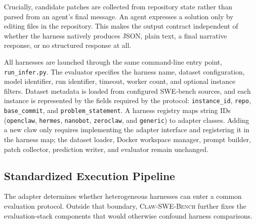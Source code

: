 Crucially, candidate patches are collected from repository state rather than parsed from an agent's final message. An agent expresses a solution only by editing files in the repository. This makes the output contract independent of whether the harness natively produces JSON, plain text, a final narrative response, or no structured response at all.

All harnesses are launched through the same command-line entry point, \texttt{run\_infer.py}. The evaluator specifies the harness name, dataset configuration, model identifier, run identifier, timeout, worker count, and optional instance filters. Dataset metadata is loaded from configured SWE-bench sources, and each instance is represented by the fields required by the protocol: \texttt{instance\_id}, \texttt{repo}, \texttt{base\_commit}, and \texttt{problem\_statement}. A harness registry maps string IDs (\texttt{openclaw}, \texttt{hermes}, \texttt{nanobot}, \texttt{zeroclaw}, and \texttt{generic}) to adapter classes. Adding a new claw only requires implementing the adapter interface and registering it in the harness map; the dataset loader, Docker workspace manager, prompt builder, patch collector, prediction writer, and evaluator remain unchanged.

\subsection{Standardized Execution Pipeline}
\label{sec:exec_pipeline}

The adapter determines whether heterogeneous harnesses can enter a common evaluation protocol. Outside that boundary, \textsc{Claw-SWE-Bench} further fixes the evaluation-stack components that would otherwise confound harness comparisons.


